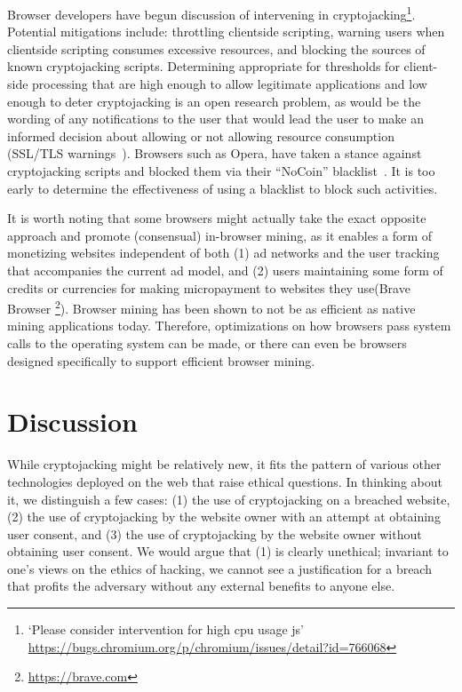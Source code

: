 Browser developers have begun discussion of intervening in cryptojacking\footnote{`Please consider intervention for high cpu usage js' \url{https://bugs.chromium.org/p/chromium/issues/detail?id=766068}}. Potential mitigations include: throttling clientside scripting, warning users when clientside scripting consumes excessive resources, and blocking the sources of known cryptojacking scripts. Determining appropriate for thresholds for client-side processing that are high enough to allow legitimate applications and low enough to deter cryptojacking is an open research problem, as would be the wording of any notifications to the user that would lead the user to make an informed decision about allowing or not allowing resource consumption (\cf SSL/TLS warnings~\cite{SEAAC09,SHB11,Acer:2017:WWR:3133956.3134007}).
Browsers such as Opera, have taken a stance against cryptojacking scripts and blocked them via their ``NoCoin'' blacklist~\cite{operanocoin}. It is too early to determine the effectiveness of using a blacklist to block such activities.  

It is worth noting that some browsers might actually take the exact opposite approach and promote (consensual) in-browser mining, as it enables a form of monetizing websites independent of both (1) ad networks and the user tracking that accompanies the current ad model, and (2) users maintaining some form of credits or currencies for making micropayment to websites they use(\eg Brave Browser \footnote{\url{https://brave.com}}). Browser mining has been shown to not be as efficient as native mining applications today. Therefore, optimizations on how browsers pass system calls to the operating system can be made, or there can even be browsers designed specifically to support efficient browser mining. 



\section{Discussion}
\label{sec:ethics}

While cryptojacking might be relatively new, it fits the pattern of various other technologies deployed on the web that raise ethical questions. In thinking about it, we distinguish a few cases: (1) the use of cryptojacking on a breached website, (2) the use of cryptojacking by the website owner with an attempt at obtaining user consent, and (3) the use of cryptojacking by the website owner without obtaining user consent. We would argue that (1) is clearly unethical; invariant to one's views on the ethics of hacking, we cannot see a justification for a breach that profits the adversary without any external benefits to anyone else.

